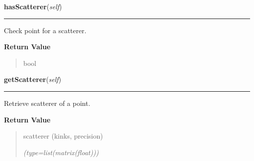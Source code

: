     \label{gblfit:GblPoint:hasScatterer}

    \vspace{0.5ex}

\hspace{.8\funcindent}\begin{boxedminipage}{\funcwidth}

    \raggedright \textbf{hasScatterer}(\textit{self})

    \vspace{-1.5ex}

    \rule{\textwidth}{0.5\fboxrule}
\setlength{\parskip}{2ex}
    Check point for a scatterer.

\setlength{\parskip}{1ex}
      \textbf{Return Value}
    \vspace{-1ex}

      \begin{quote}
      bool

      \end{quote}

    \end{boxedminipage}

    \label{gblfit:GblPoint:getScatterer}

    \vspace{0.5ex}

\hspace{.8\funcindent}\begin{boxedminipage}{\funcwidth}

    \raggedright \textbf{getScatterer}(\textit{self})

    \vspace{-1.5ex}

    \rule{\textwidth}{0.5\fboxrule}
\setlength{\parskip}{2ex}
    Retrieve scatterer of a point.

\setlength{\parskip}{1ex}
      \textbf{Return Value}
    \vspace{-1ex}

      \begin{quote}
      scatterer (kinks, precision)

      {\it (type=list(matrix(float)))}

      \end{quote}

    \end{boxedminipage}

